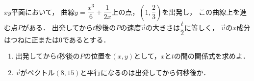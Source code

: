 \documentclass[../../main.tex]{subfiles}
\begin{document}
$xy$平面において，
曲線$\displaystyle y=\dfrac{x^3}{6}+\dfrac{1}{2x}$上の点，$\displaystyle\left(1,\dfrac{2}{3}\right)$を出発し，
この曲線上を進む点$P$がある．
出発してから$t$秒後の$P$の速度$\vec{v}$の大きさは$\displaystyle\dfrac{t}{2}$に等しく，
$\vec{v}$の$x$成分はつねに正または0であるとする．
\begin{enumerate}
  \item 出発してから$t$秒後の$P$の位置を$(x,y)$として，$x$と$t$の間の関係式を求めよ．
  \item $\vec{v}$がベクトル$(8,15)$と平行になるのは出発してから何秒後か．
\end{enumerate}
\end{document}
